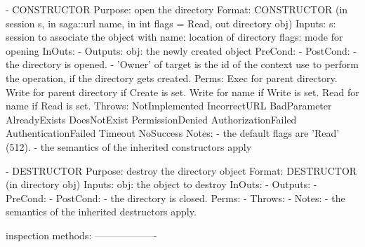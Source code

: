 \begin{myspec}
    - CONSTRUCTOR
      Purpose:  open the directory
      Format:   CONSTRUCTOR        (in  session    s,
                                    in  saga::url  name,
                                    in  int        flags = Read,
                                    out directory  obj)
      Inputs:   s:                  session to associate the
                                    object with
                name:               location of directory
                flags:              mode for opening
      InOuts:   -
      Outputs:  obj:                the newly created object
      PreCond:  -
      PostCond: - the directory is opened.
                - 'Owner' of target is the id of the context
                  use to perform the operation, if the
                  directory gets created.
      Perms:    Exec  for parent directory.
                Write for parent directory if Create is set.
                Write for name if Write is set.
                Read  for name if Read  is set.
      Throws:   NotImplemented
                IncorrectURL
                BadParameter
                AlreadyExists
                DoesNotExist
                PermissionDenied
                AuthorizationFailed
                AuthenticationFailed
                Timeout
                NoSuccess
      Notes:    - the default flags are 'Read' (512).
                - the semantics of the inherited constructors
                  apply
 
 
    - DESTRUCTOR
      Purpose:  destroy the directory object
      Format:   DESTRUCTOR         (in  directory obj)
      Inputs:   obj:                the object to destroy
      InOuts:   -
      Outputs:  -
      PreCond:  -
      PostCond: - the directory is closed.
      Perms:    - 
      Throws:   - 
      Notes:    - the semantics of the inherited destructors
                  apply.
 
 
    inspection methods:
    -------------------
 

\end{myspec}
